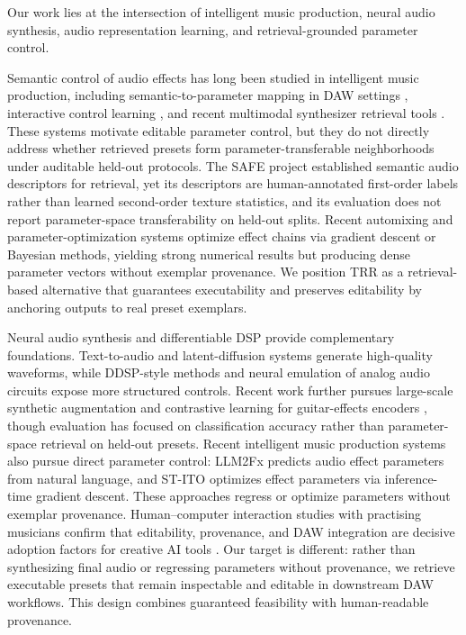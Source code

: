 Our work lies at the intersection of intelligent music production, neural audio synthesis, audio representation learning, and retrieval-grounded parameter control.

Semantic control of audio effects has long been studied in intelligent music production, including semantic-to-parameter mapping in DAW settings \citep{stables2014semantic}, interactive control learning \citep{huang2014active}, and recent multimodal synthesizer retrieval tools \citep{bryan2024synthscribe}. These systems motivate editable parameter control, but they do not directly address whether retrieved presets form parameter-transferable neighborhoods under auditable held-out protocols. The SAFE project \citep{stables2014semantic} established semantic audio descriptors for retrieval, yet its descriptors are human-annotated first-order labels rather than learned second-order texture statistics, and its evaluation does not report parameter-space transferability on held-out splits. Recent automixing and parameter-optimization systems \citep{steinmetz2022automix,moliner2025megami,benetos2024stito} optimize effect chains via gradient descent or Bayesian methods, yielding strong numerical results but producing dense parameter vectors without exemplar provenance. We position TRR as a retrieval-based alternative that guarantees executability and preserves editability by anchoring outputs to real preset exemplars.

Neural audio synthesis and differentiable DSP provide complementary foundations. Text-to-audio and latent-diffusion systems \citep{liu2023audioldm,agostinelli2023musiclm,liu2024audioldm2} generate high-quality waveforms, while DDSP-style methods \citep{engel2020ddsp,peladeau2024blind,liu2024ddspSFX} and neural emulation of analog audio circuits \citep{wright2020realtime} expose more structured controls. Recent work further pursues large-scale synthetic augmentation and contrastive learning for guitar-effects encoders \citep{wright2024openamp}, though evaluation has focused on classification accuracy rather than parameter-space retrieval on held-out presets. Recent intelligent music production systems also pursue direct parameter control: LLM2Fx \citep{doh2025llm2fx} predicts audio effect parameters from natural language, and ST-ITO \citep{benetos2024stito} optimizes effect parameters via inference-time gradient descent. These approaches regress or optimize parameters without exemplar provenance. Human--computer interaction studies with practising musicians confirm that editability, provenance, and DAW integration are decisive adoption factors for creative AI tools \citep{fiebrink2009wekinator,krol2025codesign,tchemeube2023mmmc}. Our target is different: rather than synthesizing final audio or regressing parameters without provenance, we retrieve executable presets that remain inspectable and editable in downstream DAW workflows. This design combines guaranteed feasibility with human-readable provenance.

